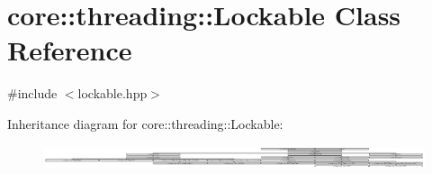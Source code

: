 \hypertarget{classcore_1_1threading_1_1_lockable}{\section{core\-:\-:threading\-:\-:Lockable Class Reference}
\label{classcore_1_1threading_1_1_lockable}
}


{\ttfamily \#include $<$lockable.\-hpp$>$}

Inheritance diagram for core\-:\-:threading\-:\-:Lockable\-:\begin{figure}[H]
\begin{center}
\leavevmode
\includegraphics[height=0.683761cm]{classcore_1_1threading_1_1_lockable}
\end{center}
\end{figure}
